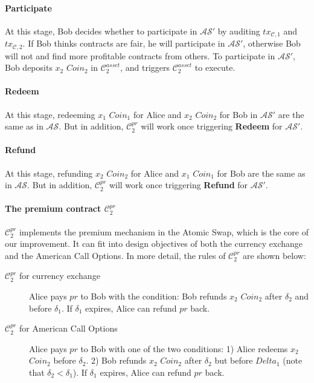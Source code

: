 \paragraph{\textbf{Participate}}
At this stage, Bob decides whether to participate in $\mathcal{AS}'$ by auditing $tx_{\mathcal{C}, 1}$ and $tx_{\mathcal{C}, 2}$.
If Bob thinks contracts are fair, he will participate in $\mathcal{AS}'$, otherwise Bob will not and find more profitable contracts from others.
To participate in $\mathcal{AS}'$, Bob deposits $x_2$ $Coin_2$ in $\mathcal{C}^{asset}_2$, and triggers $\mathcal{C}^{asset}_2$ to execute.

\paragraph{\textbf{Redeem}}
At this stage, redeeming $x_1$ $Coin_1$ for Alice and $x_2$ $Coin_2$ for Bob in $\mathcal{AS}'$ are the same as in $\mathcal{AS}$.
But in addition, $\mathcal{C}^{pr}_2$ will work once triggering \textbf{Redeem} for $\mathcal{AS}'$.

\paragraph{\textbf{Refund}}
At this stage, refunding $x_2$ $Coin_2$ for Alice and $x_1$ $Coin_1$ for Bob are the same as in $\mathcal{AS}$.
But in addition, $\mathcal{C}^{pr}_2$ will work once triggering \textbf{Refund} for $\mathcal{AS}'$.


\paragraph{The premium contract $\mathcal{C}^{pr}_2$}

$\mathcal{C}^{pr}_2$ implements the premium mechanism in the Atomic Swap, which is the core of our improvement.
It can fit into design objectives of both the currency exchange and the American Call Options.
In more detail, the rules of $\mathcal{C}^{pr}_2$ are shown below:

\begin{description}
    \item[$\mathcal{C}^{pr}_2$ for currency exchange] Alice pays $pr$ to Bob with the condition:
    Bob refunds $x_2$ $Coin_2$ after $\delta_2$ and before $\delta_1$.
    If $\delta_1$ expires, Alice can refund $pr$ back.
    \item[$\mathcal{C}^{pr}_2$ for American Call Options] Alice pays $pr$ to Bob with one of the two conditions:
    1) Alice redeems $x_2$ $Coin_2$ before $\delta_2$.
    2) Bob refunds $x_2$ $Coin_2$ after $\delta_2$ but before $Delta_1$ (note that $\delta_2 < \delta_1$).
    If $\delta_1$ expires, Alice can refund $pr$ back.
\end{description}